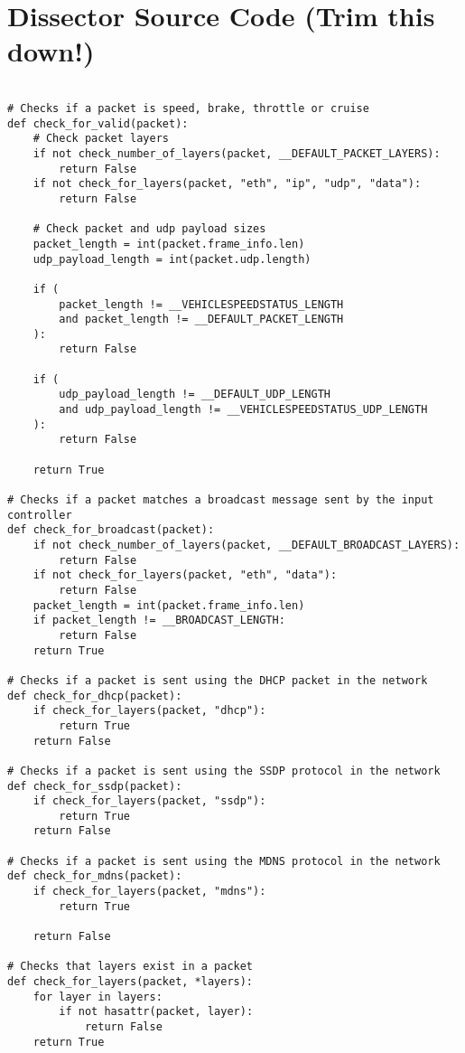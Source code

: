 \usepackage{minted}

\section{Dissector Source Code (Trim this down!)}
\begin{verbatim}

# Checks if a packet is speed, brake, throttle or cruise
def check_for_valid(packet):
    # Check packet layers
    if not check_number_of_layers(packet, __DEFAULT_PACKET_LAYERS):
        return False
    if not check_for_layers(packet, "eth", "ip", "udp", "data"):
        return False

    # Check packet and udp payload sizes
    packet_length = int(packet.frame_info.len)
    udp_payload_length = int(packet.udp.length)

    if (
        packet_length != __VEHICLESPEEDSTATUS_LENGTH
        and packet_length != __DEFAULT_PACKET_LENGTH
    ):
        return False

    if (
        udp_payload_length != __DEFAULT_UDP_LENGTH
        and udp_payload_length != __VEHICLESPEEDSTATUS_UDP_LENGTH
    ):
        return False

    return True

# Checks if a packet matches a broadcast message sent by the input controller
def check_for_broadcast(packet):
    if not check_number_of_layers(packet, __DEFAULT_BROADCAST_LAYERS):
        return False
    if not check_for_layers(packet, "eth", "data"):
        return False
    packet_length = int(packet.frame_info.len)
    if packet_length != __BROADCAST_LENGTH:
        return False
    return True

# Checks if a packet is sent using the DHCP packet in the network
def check_for_dhcp(packet):
    if check_for_layers(packet, "dhcp"):
        return True
    return False

# Checks if a packet is sent using the SSDP protocol in the network
def check_for_ssdp(packet):
    if check_for_layers(packet, "ssdp"):
        return True
    return False

# Checks if a packet is sent using the MDNS protocol in the network
def check_for_mdns(packet):
    if check_for_layers(packet, "mdns"):
        return True

    return False

# Checks that layers exist in a packet
def check_for_layers(packet, *layers):
    for layer in layers:
        if not hasattr(packet, layer):
            return False
    return True


\end{verbatim}
